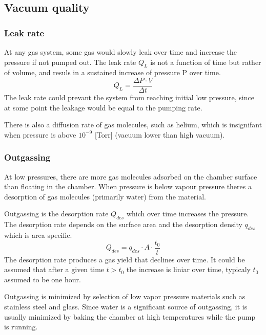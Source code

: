 \documentclass[\main/master.tex]{subfiles}
\begin{document}
\subsection{Vacuum quality}
\subsubsection{Leak rate}
At any gas system, some gas would slowly leak over time and increase the pressure if not pumped out. The leak rate $Q_L$ is not a function of time but rather of volume, and resuls in a sustained increase of pressure P over time.
\begin{equation}
Q_L = \frac{\Delta P\cdot V}{\Delta t}  \label{eqn:energy-mass-equivalence-relation}
\end{equation}
The leak rate could prevant the system from reaching initial low pressure, since at some point the leakage would be equal to the pumping rate.
\par\noindent
There is also a diffusion rate of gas molecules, such as helium, which is insignifant when pressure is above $10^{-9}$ [Torr] (vacuum lower than high vacuum). 

\subsubsection{Outgassing}
At low pressures, there are more gas molecules adsorbed on the chamber surface than floating in the chamber. When pressure is below vapour pressure theres a desorption of gas molecules (primarily water) from the material.
\par\noindent
Outgassing is the desorption rate $Q_{des}$ which over time increases the pressure. The desorption rate depends on the surface area and the desorption density $q_{des}$ which is area specific. 
\begin{equation}
Q_{des} = q_{des}\cdot A\cdot\frac{t_0}{t}  \label{eqn:energy-mass-equivalence-relation}
\end{equation}
The desorption rate produces a gas yield that declines over time. It could be assumed that after a given time $t>t_0$ the increase is liniar over time, typicaly $t_0$ assumed to be one hour.
\par\noindent
Outgassing is minimized by selection of low vapor pressure materials such as stainless steel and glass. Since water is a significant source of outgassing, it is usually minimized by baking the chamber at high temperatures while the pump is running.
\end{document}
